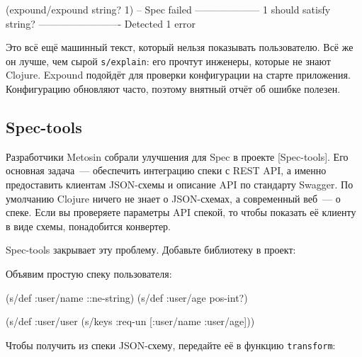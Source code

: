 \begin{english}
  \begin{clojure}
(expound/expound string? 1)
-- Spec failed --------------------
  1
should satisfy
  string?
-------------------------
Detected 1 error
  \end{clojure}
\end{english}


Это всё ещё машинный текст, который нельзя показывать пользователю. Всё же он
лучше, чем сырой \verb|s/explain|: его прочтут инженеры, которые не знают
Clojure. Expound подойдёт для проверки конфигурации на старте
приложения. Конфигурацию обновляют часто, поэтому внятный отчёт об ошибке
полезен.


\subsection{Spec-tools}

Разработчики Metosin собрали улучшения для Spec в проекте
[Spec-tools]. Его
основная задача~--- обеспечить интеграцию спеки с REST API, а именно
предоставить клиентам JSON-схемы и описание API по стандарту Swagger. По
умолчанию Clojure ничего не знает о JSON-схемах, а современный веб~--- о
спеке. Если вы проверяете параметры API спекой, то чтобы показать её клиенту в
виде схемы, понадобится конвертер.

Spec-tools закрывает эту проблему. Добавьте библиотеку в проект:

\begin{english}
  \begin{clojure}
  \end{clojure}
\end{english}

Объявим простую спеку пользователя:

\begin{english}
  \begin{clojure}
(s/def :user/name ::ne-string)
(s/def :user/age pos-int?)

(s/def :user/user
  (s/keys :req-un [:user/name :user/age]))
  \end{clojure}
\end{english}

Чтобы получить из спеки JSON-схему, передайте её в функцию \verb|transform|:

